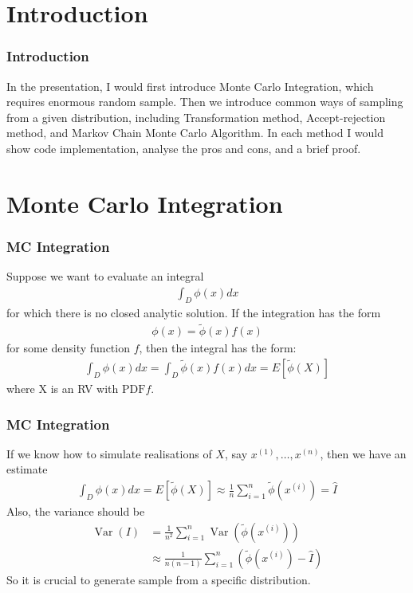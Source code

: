 \frame[plain]{\titlepage}

\section{Introduction}

\begin{frame}
    \frametitle{Introduction}
    
    In the presentation, I would first introduce Monte Carlo Integration, which requires enormous random sample. Then we introduce common ways of sampling from a given distribution, including Transformation method, Accept-rejection method, and Markov Chain Monte Carlo Algorithm. In each method I would show code implementation, analyse the pros and cons, and a brief proof.
    
\end{frame}
\section{Monte Carlo Integration}
\begin{frame}
    \frametitle{MC Integration}
    Suppose we want to evaluate an integral
    \begin{align*}
    \int_D \phi(x) d x
    \end{align*}
    for which there is no closed analytic solution. If the integration has the form
    \begin{align*}
    \phi(x)=\tilde{\phi}(x) f(x)
    \end{align*}
    for some density function \(f\), then the integral has the form:
    \begin{align*}
    \int_D \phi(x) d x=\int_D \tilde{\phi}(x) f(x) d x=E[\tilde{\phi}(X)]
    \end{align*}
    where \(\mathrm{X}\) is an RV with \(\mathrm{PDF} f\). 

    

\end{frame}
\begin{frame}
    \frametitle{MC Integration}
    If we know how to simulate realisations of \(X\), say \(x^{(1)}, \ldots, x^{(n)}\), then we have an estimate
    \begin{align*}
    \int_D \phi(x) d x=E[\tilde{\phi}(X)] \approx \frac{1}{n} \sum_{i=1}^n \tilde{\phi}\left(x^{(i)}\right)=\hat{I}
    \end{align*}
    Also, the variance should be
    \begin{align*}
        \operatorname{Var}(I) &= \frac{1}{n^2} \sum_{i=1}^n \operatorname{Var}\left(\tilde{\phi}\left(x^{(i)}\right)\right) \\
        &\approx \frac{1}{n(n-1)} \sum_{i=1}^n \left(\tilde{\phi}\left(x^{(i)}\right) - \hat I\right)
    \end{align*}
    So it is crucial to generate sample from a specific distribution.

    

\end{frame}
